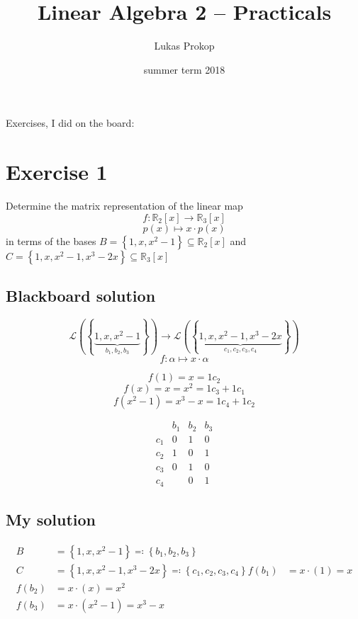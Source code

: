 \documentclass[a4paper]{article}
\title{Linear Algebra 2 -- Practicals}
\author{Lukas Prokop}
\date{summer term 2018}
\theoremstyle{definition}
\newcommand\set[1]{\left\{#1\right\}}
\begin{document}
\maketitle
\tableofcontents

\clearpage

Exercises, I did on the board: 

\section{Exercise 1}
\begin{ex}
  Determine the matrix representation of the linear map
  \[ f: \mathbb R_2[x] \to \mathbb R_3[x] \]
  \[ p(x) \mapsto x \cdot p(x) \]
  in terms of the bases $B = \set{1, x, x^2 - 1} \subseteq \mathbb R_2[x]$ and $C = \set{1, x, x^2 - 1, x^3 - 2x} \subseteq \mathbb R_3[x]$
\end{ex}

\subsection{Blackboard solution}

\[ \mathcal L(\set{\underbrace{1, x, x^2-1}_{b_1, b_2, b_3}}) \to \mathcal L(\set{\underbrace{1, x, x^2-1, x^3 - 2x}_{c_1, c_2, c_3, c_4}}) \]
\[ f: \alpha \mapsto x \cdot \alpha \]

\[ f(1) = x = 1 c_2 \]
\[ f(x) = x = x^2 = 1c_3 + 1 c_1 \]
\[ f(x^2-1) = x^3 - x = 1 c_4 + 1 c_2 \]

\[
  \begin{matrix}
        & b_1 & b_2 & b_3 \\
  \hline
    c_1 & 0 & 1 & 0 \\
    c_2 & 1 & 0 & 1 \\
    c_3 & 0 & 1 & 0 \\
    c_4 &   & 0 & 1
  \end{matrix}
\]

\subsection{My solution}

\begin{align*}
  B &= \set{1, x, x^2 - 1} \eqqcolon \set{b_1, b_2, b_3} \\
  C &= \set{1, x, x^2 - 1, x^3 - 2x} \eqqcolon \set{c_1, c_2, c_3, c_4}
  f(b_1) &= x \cdot (1) = x \\
  f(b_2) &= x \cdot (x) = x^2 \\
  f(b_3) &= x \cdot (x^2 - 1) = x^3 - x
\end{align*}
\end{document}

